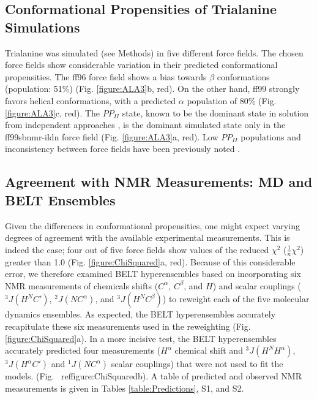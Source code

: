 \documentclass[journal=jacsat,manuscript=article]{achemso}
\begin{document}
\subsection*{Conformational Propensities of Trialanine Simulations}

Trialanine was simulated (see Methods) in five different force fields.  The chosen force fields show considerable variation in their predicted conformational propensities.  The ff96 force field shows a bias towards $\beta$ conformations (population: 51\%) (Fig. \ref{figure:ALA3}b, red).  On the other hand, ff99 strongly favors helical conformations, with a predicted $\alpha$ population of 80\% (Fig. \ref{figure:ALA3}c, red).  The $PP_{II}$ state, known to be the dominant state in solution from independent approaches \cite{Grdadolnik2011, Graf2007, Avbelj2006}, is the dominant simulated state only in the ff99sbnmr-ildn force field (Fig. \ref{figure:ALA3}a, red).  Low $PP_{II}$ populations and inconsistency between force fields have been previously noted \cite{Graf2007, beauchamp2012protein, nerenberg2011, best2008}.  

\subsection*{Agreement with NMR Measurements: MD and BELT Ensembles}

Given the differences in conformational propensities, one might expect varying degrees of agreement with the available experimental measurements.  This is indeed the case; four out of five force fields show values of the reduced $\chi^2$ ($\frac{1}{n} \chi^2$) greater than 1.0 (Fig. \ref{figure:ChiSquared}a, red).  Because of this considerable error, we therefore examined BELT hyperensembles based on incorporating six NMR measurements of chemicals shifts ($C^\alpha$, $C^\beta$, and $H$) and scalar couplings ($^3J(H^N C')$,  $^2J(N C^\alpha)$, and $^3J(H^N C^\beta)$) to reweight each of the five molecular dynamics ensembles.  As expected, the BELT hyperensembles accurately recapitulate these six measurements used in the reweighting (Fig. \ref{figure:ChiSquared}a).  In a more incisive test, the BELT hyperensembles accurately predicted four measurements ($H^\alpha$ chemical shift and $^3J(H^N H^\alpha)$, $^3J(H^\alpha C')$ and $^1J(N C^\alpha)$ scalar couplings) that were not used to fit the models.   (Fig. \
ref{figure:ChiSquared}b).  A table of predicted and observed NMR measurements is given in Tables \ref{table:Predictions}, S1, and S2.  
\end{document}
